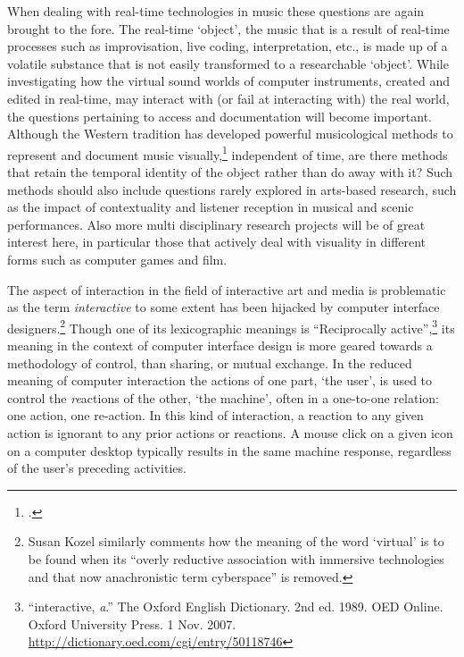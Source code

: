When dealing with real-time technologies in music these questions are again brought to the fore. The real-time `object', the music that is a result of real-time processes such as improvisation, live coding, interpretation, etc., is made up of a volatile substance that is not easily transformed to a researchable `object'. While investigating how the virtual sound worlds of computer instruments, created and edited in real-time, may interact with (or fail at interacting with) the real world, the questions pertaining to access and documentation will become important. 
Although the Western tradition has developed powerful musicological methods to represent and document music visually,\footcite[See]{bregman94} independent of time, are there methods that retain the temporal identity of the object rather than do away with it? Such methods should also include questions rarely explored in arts-based research, such as the impact of contextuality and listener reception in musical and scenic performances. Also more multi disciplinary research projects will be of great interest here, in particular those that actively deal with visuality in different forms such as computer games and film. 

The aspect of interaction in the field of interactive art and media is problematic as the term \emph{interactive} to some extent has been hijacked by computer interface designers.\footnote{Susan Kozel similarly comments how the meaning of the word `virtual' is to be found when its ``overly reductive association with immersive technologies and that now anachronistic term cyberspace'' is removed.} Though one of its lexicographic meanings is ``Reciprocally active'',\footnote{``interactive, \textit{a}.'' The Oxford English Dictionary. 2nd ed. 1989. OED Online. Oxford University Press. 1 Nov. 2007. \url{http://dictionary.oed.com/cgi/entry/50118746}} its meaning in the context of computer interface design is more geared towards a methodology of control, than sharing, or mutual exchange. In the reduced meaning of computer interaction the actions of one part, `the user', is used to control the \emph{re}actions of the other, `the machine', often in a one-to-one relation: one action, one re-action. In this kind of interaction, a reaction to any given action is ignorant to any prior actions or reactions. A mouse click on a given icon on a computer desktop typically results in the same machine response, regardless of the user's preceding activities.

